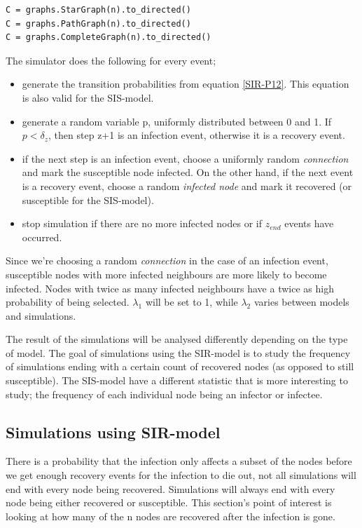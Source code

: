 \documentclass[12pt]{article} %
\numberwithin{equation}{section}
\begin{document}
\begin{verbatim}
C = graphs.StarGraph(n).to_directed()
C = graphs.PathGraph(n).to_directed()
C = graphs.CompleteGraph(n).to_directed()
\end{verbatim}


The simulator does the following for every event; 
\begin{itemize}
    \item generate the transition probabilities from equation \ref{SIR-P12}. This equation is also valid for the SIS-model.
    \item generate a random variable p, uniformly distributed between 0 and 1. If $p<\delta_z$, then step z+1 is an infection event, otherwise it is a recovery event.
    \item if the next step is an infection event, choose a uniformly random \textit{connection} and mark the susceptible node infected. On the other hand, if the next event is a recovery event, choose a random \textit{infected node} and mark it recovered (or susceptible for the SIS-model).
    \item stop simulation if there are no more infected nodes or if $z_{end}$ events have occurred.
\end{itemize}

Since we're choosing a random \textit{connection} in the case of an infection event, susceptible nodes with more infected neighbours are more likely to become infected. Nodes with twice as many infected neighbours have a twice as high probability of being selected. $\lambda_1$ will be set to 1, while $\lambda_2$ varies between models and simulations. 

The result of the simulations will be analysed differently depending on the type of model. The goal of simulations using the SIR-model is to study the frequency of simulations ending with a certain count of recovered nodes (as opposed to still susceptible). The SIS-model have a different statistic that is more interesting to study; the frequency of each individual node being an infector or infectee.



\subsection{Simulations using SIR-model}\label{SIRsimsection}
There is a probability that the infection only affects a subset of the nodes before we get enough recovery events for the infection to die out, not all simulations will end with every node being recovered. Simulations will always end with every node being either recovered or susceptible. This section's point of interest is looking at how many of the n nodes are recovered after the infection is gone.
\end{document}
